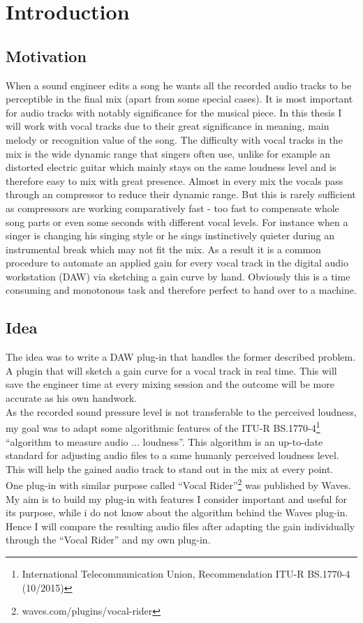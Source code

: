 \chapter{Introduction}
\label{chapter:introduction}

\section{Motivation}

When a sound engineer edits a song he wants all the recorded audio tracks to be perceptible in the final mix (apart from some special cases). It is most important for audio tracks with notably significance for the musical piece. In this thesis I will work with vocal tracks due to their great significance in meaning, main melody or recognition value of the song. The difficulty with vocal tracks in the mix is the wide dynamic range that singers often use, unlike for example an distorted electric guitar which mainly stays on the same loudness level and is therefore easy to mix with great presence. Almost in every mix the vocals pass through an compressor to reduce their dynamic range. But this is rarely sufficient as compressors are working comparatively fast - too fast to compensate whole song parts  or even some seconds with different vocal levels. For instance when a singer is changing his singing style or he sings instinctively quieter during an instrumental break which may not fit the mix. As a result it is a common procedure to automate an applied gain for every vocal track in the digital audio workstation (DAW) via sketching a gain curve by hand. Obviously this is a time consuming and monotonous task and therefore perfect to hand over to a machine.\\

\section{Idea}

The idea was to write a DAW plug-in that handles the former described problem. A plugin that will sketch a gain curve for a vocal track in real time. This will save the engineer time at every mixing session and the outcome will be more accurate as his own handwork.\\
As the recorded sound pressure level is not transferable to the perceived loudness, my goal was to adapt some algorithmic features of the ITU-R BS.1770-4\footnote{International Telecommunication Union, Recommendation ITU-R BS.1770-4 (10/2015)} “algorithm to measure audio ... loudness”. This algorithm is an up-to-date standard for adjusting audio files to a same humanly perceived loudness level. This will help the gained audio track to stand out in the mix at every point.\\
One plug-in with similar purpose called “Vocal Rider”\footnote{waves.com/plugins/vocal-rider} was published by Waves. 
My aim is to build my plug-in with features I consider important and useful for its purpose, while i do not know about the algorithm behind the Waves plug-in. Hence I will compare the resulting audio files after adapting the gain individually through the “Vocal Rider” and my own plug-in.\\


